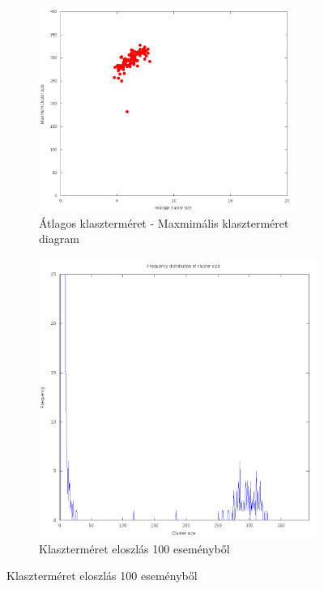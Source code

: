 \documentclass[a4paper,12pt]{article}
\begin{document}
\begin{figure}[H]
	\centering
	\begin{subfigure}{.49\textwidth}
		\includegraphics[width=0.92\textwidth]{mean-max16_100.png}
		\caption{ Átlagos klaszterméret - Maxmimális klaszterméret diagram }
	\end{subfigure}
	\begin{subfigure}{.49\textwidth}
		\includegraphics[width=.92\textwidth]{distribution_zoomed_16_100.png}
		\caption{ Klaszterméret eloszlás 100 eseményből } 
	\end{subfigure}
\end{figure}
\end{document}
